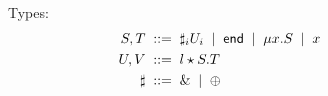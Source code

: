 \begin{figure}[h!]
  Types:
    \begin{align*}
      S, T &\; ::= \; \sharp_i U_i \;\mid\; \mathsf{end} \;\mid\; \mu x . S \;\mid\; x \\
      U, V &\; ::= \; l \star S . T\\
    \sharp &\; ::= \; \&{} \;\mid\; \oplus{}
    \end{align*}
\end{figure}


